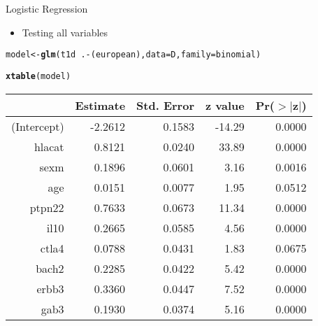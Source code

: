 \documentclass{beamer}
\makeatletter
\newcommand{\hlopt}[1]{\textcolor[rgb]{0,0,0}{#1}}%
\newcommand{\hlstd}[1]{\textcolor[rgb]{0.345,0.345,0.345}{#1}}%
\newcommand{\hlkwb}[1]{\textcolor[rgb]{0.69,0.353,0.396}{#1}}%
\newcommand{\hlkwc}[1]{\textcolor[rgb]{0.333,0.667,0.333}{#1}}%
\newcommand{\hlkwd}[1]{\textcolor[rgb]{0.737,0.353,0.396}{\textbf{#1}}}%
\newenvironment{kframe}{%
 \def\at@end@of@kframe{}%
 \ifinner\ifhmode%
  \def\at@end@of@kframe{\end{minipage}}%
  \begin{minipage}{\columnwidth}%
 \fi\fi%
 \def\FrameCommand##1{\hskip\@totalleftmargin \hskip-\fboxsep
 \colorbox{shadecolor}{##1}\hskip-\fboxsep
     \hskip-\linewidth \hskip-\@totalleftmargin \hskip\columnwidth}%
 \MakeFramed {\advance\hsize-\width
   \@totalleftmargin\z@ \linewidth\hsize
   \@setminipage}}%
 {\par\unskip\endMakeFramed%
 \at@end@of@kframe}
\makeatother
\begin{document}
\begin{frame}[fragile]{Logistic Regression}
  \begin{itemize}
    \item Testing all variables
  \end{itemize}
\begin{kframe}
\begin{alltt}
\hlstd{model} \hlkwb{<-} \hlkwd{glm}\hlstd{(t1d} \hlopt{~} \hlstd{.}\hlopt{-}\hlstd{(european),} \hlkwc{data}\hlstd{=D,} \hlkwc{family}\hlstd{=binomial)}
\end{alltt}


{\ttfamily\noindent\bfseries\color{errorcolor}{\#\# Error: protect(): protection stack overflow}}\begin{alltt}
\hlkwd{xtable}\hlstd{(model)}
\end{alltt}
\end{kframe}%
\begin{table}[ht]
\centering
\begin{tabular}{rrrrr}
  \hline
 & Estimate & Std. Error & z value & Pr($>$$|$z$|$) \\ 
  \hline
(Intercept) & -2.2612 & 0.1583 & -14.29 & 0.0000 \\ 
  hlacat & 0.8121 & 0.0240 & 33.89 & 0.0000 \\ 
  sexm & 0.1896 & 0.0601 & 3.16 & 0.0016 \\ 
  age & 0.0151 & 0.0077 & 1.95 & 0.0512 \\ 
  ptpn22 & 0.7633 & 0.0673 & 11.34 & 0.0000 \\ 
  il10 & 0.2665 & 0.0585 & 4.56 & 0.0000 \\ 
  ctla4 & 0.0788 & 0.0431 & 1.83 & 0.0675 \\ 
  bach2 & 0.2285 & 0.0422 & 5.42 & 0.0000 \\ 
  erbb3 & 0.3360 & 0.0447 & 7.52 & 0.0000 \\ 
  gab3 & 0.1930 & 0.0374 & 5.16 & 0.0000 \\ 
   \hline
\end{tabular}
\end{table}

\end{frame}
\end{document}
